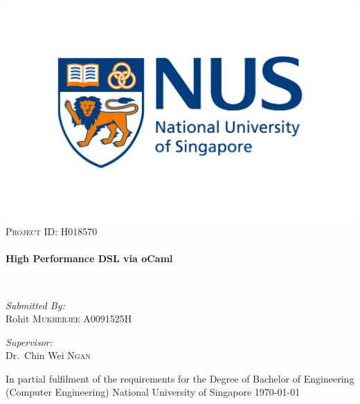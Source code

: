 \begin{titlepage}
\begin{center}

\includegraphics[width=1\textwidth]{figures/nus_logo.jpg}\\[1cm]

\textsc{\Large Project ID: H018570}\\[0.5cm]

\HRule \\[0.4cm]
{ \huge \bfseries High Performance DSL via oCaml \\[0.4cm] }

\HRule \\[1.5cm]

\noindent
\begin{minipage}{0.4\textwidth}
\begin{flushleft} \large
\emph{Submitted By:}\\
Rohit \textsc{Mukherjee}
A0091525H
\end{flushleft}
\end{minipage}%
\begin{minipage}{0.4\textwidth}
\begin{flushright} \large
\emph{Supervisor:} \\
Dr.~Chin Wei \textsc{Ngan}
\end{flushright}
\end{minipage}
\vfill

In partial fulfilment of the requirements for the Degree of 
Bachelor of Engineering (Computer Engineering) National University of Singapore 
{\large \today}

\end{center}
\end{titlepage}